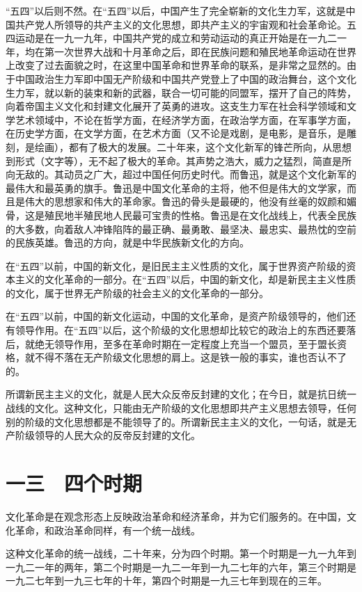 “五四”以后则不然。在“五四”以后，中国产生了完全崭新的文化生力军，这就是中国共产党人所领导的共产主义的文化思想，即共产主义的宇宙观和社会革命论。五四运动是在一九一九年，中国共产党的成立和劳动运动的真正开始是在一九二一年，均在第一次世界大战和十月革命之后，即在民族问题和殖民地革命运动在世界上改变了过去面貌之时，在这里中国革命和世界革命的联系，是非常之显然的。由于中国政治生力军即中国无产阶级和中国共产党登上了中国的政治舞台，这个文化生力军，就以新的装束和新的武器，联合一切可能的同盟军，摆开了自己的阵势，向着帝国主义文化和封建文化展开了英勇的进攻。这支生力军在社会科学领域和文学艺术领域中，不论在哲学方面，在经济学方面，在政治学方面，在军事学方面，在历史学方面，在文学方面，在艺术方面（又不论是戏剧，是电影，是音乐，是雕刻，是绘画），都有了极大的发展。二十年来，这个文化新军的锋芒所向，从思想到形式（文字等），无不起了极大的革命。其声势之浩大，威力之猛烈，简直是所向无敌的。其动员之广大，超过中国任何历史时代。而鲁迅，就是这个文化新军的最伟大和最英勇的旗手。鲁迅是中国文化革命的主将，他不但是伟大的文学家，而且是伟大的思想家和伟大的革命家。鲁迅的骨头是最硬的，他没有丝毫的奴颜和媚骨，这是殖民地半殖民地人民最可宝贵的性格。鲁迅是在文化战线上，代表全民族的大多数，向着敌人冲锋陷阵的最正确、最勇敢、最坚决、最忠实、最热忱的空前的民族英雄。鲁迅的方向，就是中华民族新文化的方向。

在“五四”以前，中国的新文化，是旧民主主义性质的文化，属于世界资产阶级的资本主义的文化革命的一部分。在“五四”以后，中国的新文化，却是新民主主义性质的文化，属于世界无产阶级的社会主义的文化革命的一部分。

在“五四”以前，中国的新文化运动，中国的文化革命，是资产阶级领导的，他们还有领导作用。在“五四”以后，这个阶级的文化思想却比较它的政治上的东西还要落后，就绝无领导作用，至多在革命时期在一定程度上充当一个盟员，至于盟长资格，就不得不落在无产阶级文化思想的肩上。这是铁一般的事实，谁也否认不了的。

所谓新民主主义的文化，就是人民大众反帝反封建的文化；在今日，就是抗日统一战线的文化。这种文化，只能由无产阶级的文化思想即共产主义思想去领导，任何别的阶级的文化思想都是不能领导了的。所谓新民主主义的文化，一句话，就是无产阶级领导的人民大众的反帝反封建的文化。

\section{一三　四个时期}

文化革命是在观念形态上反映政治革命和经济革命，并为它们服务的。在中国，文化革命，和政治革命同样，有一个统一战线。

这种文化革命的统一战线，二十年来，分为四个时期。第一个时期是一九一九年到一九二一年的两年，第二个时期是一九二一年到一九二七年的六年，第三个时期是一九二七年到一九三七年的十年，第四个时期是一九三七年到现在的三年。

